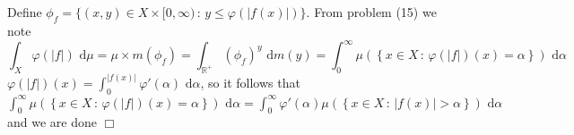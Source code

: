 \documentclass{article}
\begin{document}
\section{}
Define $\phi_f = \{ (x,y) \in X \times [0,\infty) \,:\, y \leq \varphi (|f(x)|)\}$. From problem (15) we note
$$\int_X \varphi (|f|) \textrm{ d}\mu = \mu \times m(\phi_f) = \int_{\mathbb{R}^+} (\phi_f)^{y} \textrm{ d}m(y) = \int_0^{\infty} \mu(\left\{x\in X \,:\, \varphi(|f|)(x) = \alpha\right\}) \textrm{ d}\alpha $$
$\varphi(|f|)(x) = \int_0^{|f(x)|} \varphi{'}(\alpha)\textrm{ d}\alpha$, so it follows that $\int_0^{\infty} \mu(\left\{x \in X \,:\, \varphi(|f|)(x) = \alpha\right\}) \textrm{ d}\alpha = \int_0^\infty \varphi'(\alpha)\mu(\left\{ x \in X \,:\, |f(x)| > \alpha \right\}) \textrm{ d}\alpha$ and we are done $\Box$
\end{document}
